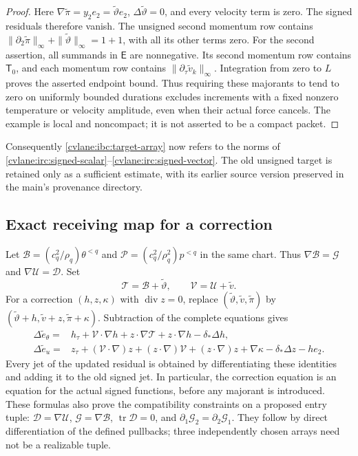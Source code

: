 \begin{proof}
Here $\nabla\widetilde\pi=y_2e_2=\widetilde\vartheta e_2$,
$\Delta\widetilde\vartheta=0$, and every velocity term is zero.
The signed residuals therefore vanish.  The unsigned second momentum
row contains $\|\partial_2\widetilde\pi\|_\infty+
\|\widetilde\vartheta\|_\infty=1+1$, with all its other terms zero.
For the second assertion, all summands in $\mathsf E$ are nonnegative.
Its second momentum row contains $\mathsf T_0$, and each momentum row
contains $\|\partial_\tau\widetilde v_k\|_\infty$.  Integration from
zero to $L$ proves the asserted endpoint bound.  Thus requiring these
majorants to tend to zero on uniformly bounded durations excludes
increments with a fixed nonzero temperature or velocity amplitude,
even when their actual force cancels.  The example is local and
noncompact; it is not asserted to be a compact packet.
\end{proof}

Consequently \eqref{cvlane:ibc:target-array} now refers to the norms of
\eqref{cvlane:irc:signed-scalar}--\eqref{cvlane:irc:signed-vector}.  The old
unsigned target is retained only as a sufficient estimate, with its
earlier source version preserved in the main's provenance directory.

\subsection{Exact receiving map for a correction}

Let $\mathcal B=(c_q^2/\rho_q)\theta^{<q}$ and
$\mathcal P=(c_q^2/\rho_q^2)p^{<q}$ in the same chart.  Thus
$\nabla\mathcal B=\mathcal G$ and $\nabla\mathcal U=\mathcal D$.
Set
\[
 \mathcal T=\mathcal B+\widetilde\vartheta,\qquad
 \mathcal V=\mathcal U+\widetilde v.
\]
For a correction $(h,z,\kappa)$ with $\operatorname{div}z=0$, replace
$(\widetilde\vartheta,\widetilde v,\widetilde\pi)$ by
$(\widetilde\vartheta+h,\widetilde v+z,\widetilde\pi+\kappa)$.
Subtraction of the complete equations gives
\begin{align}
 \Delta\widetilde e_\theta={}&
 h_\tau+\mathcal V\cdot\nabla h+z\cdot\nabla\mathcal T
 +z\cdot\nabla h-\delta_*\Delta h,
 \label{cvlane:irc:correction-scalar}\\
 \Delta\widetilde e_u={}&
 z_\tau+(\mathcal V\cdot\nabla)z+(z\cdot\nabla)\mathcal V
 +(z\cdot\nabla)z+\nabla\kappa-\delta_*\Delta z-he_2.
 \label{cvlane:irc:correction-vector}
\end{align}
Every jet of the updated residual is obtained by differentiating
these identities and adding it to the old signed jet.  In particular,
the correction equation is an equation for the actual signed
functions, before any majorant is introduced.  These formulas also
prove the compatibility constraints on a proposed entry tuple:
$\mathcal D=\nabla\mathcal U$, $\mathcal G=\nabla\mathcal B$,
$\operatorname{tr}\mathcal D=0$, and
$\partial_1\mathcal G_2=\partial_2\mathcal G_1$.
They follow by direct differentiation of the defined pullbacks;
three independently chosen arrays need not be a realizable tuple.


